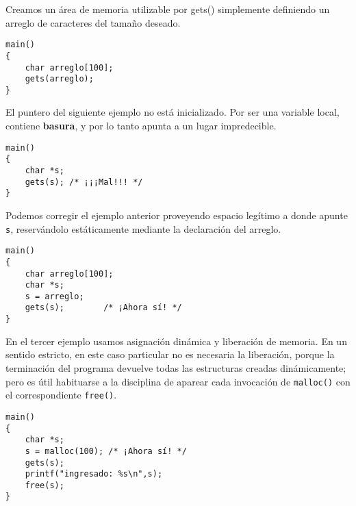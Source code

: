 \begin{ejemplo}
Creamos un área de memoria utilizable por gets() simplemente definiendo un arreglo de caracteres del tamaño deseado. 
\begin{lstlisting}
main()
{
    char arreglo[100];
    gets(arreglo);
}
\end{lstlisting}

El puntero del siguiente ejemplo no está inicializado. Por ser una variable local,
contiene \textbf{basura}, y por lo tanto apunta a un lugar impredecible.
\begin{lstlisting}
main()
{
    char *s;
    gets(s); /* ¡¡¡Mal!!! */
}
\end{lstlisting}

Podemos corregir el ejemplo anterior proveyendo espacio legítimo a donde apunte \lstinline{s}, reservándolo
estáticamente mediante la declaración del arreglo.

\begin{lstlisting}
main()
{
    char arreglo[100];
    char *s;
    s = arreglo;
    gets(s); 		/* ¡Ahora sí! */
}
\end{lstlisting}

En el tercer ejemplo usamos asignación dinámica y liberación de memoria. En un
sentido estricto, en este caso particular no es necesaria la liberación, porque
la terminación del programa devuelve todas las estructuras creadas
dinámicamente; pero es útil habituarse a la disciplina de aparear cada
invocación de \lstinline{malloc()} con el correspondiente \lstinline{free()}.

\begin{lstlisting}
main()
{
    char *s;
    s = malloc(100); /* ¡Ahora sí! */
    gets(s);
    printf("ingresado: %s\n",s);
    free(s);
}
\end{lstlisting}
\end{ejemplo}



